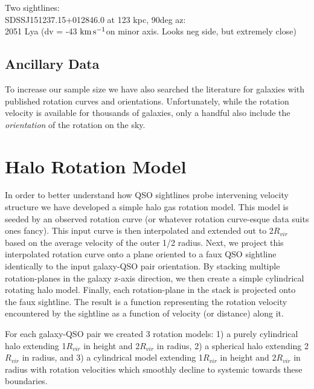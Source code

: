 \documentclass[iop]{emulateapj-rtx4}
\newcommand{\kms}{$\rm km\, s^{-1}$}
\begin{document}
Two sightlines: \\
SDSSJ151237.15+012846.0 at 123 kpc, 90deg az: \\
2051 Lya (dv = -43 \kms on minor axis. Looks neg side, but extremely close)



\subsection{Ancillary Data}
To increase our sample size we have also searched the literature for galaxies with published rotation curves and orientations. Unfortunately, while the rotation velocity is available for thousands of galaxies, only a handful also include the \emph{orientation} of the rotation on the sky. 




\section{Halo Rotation Model}
In order to better understand how QSO sightlines probe intervening velocity structure we have developed a simple halo gas rotation model. This model is seeded by an observed rotation curve (or whatever rotation curve-esque data suits ones fancy). This input curve is then interpolated and extended out to 2$R_{vir}$ based on the average velocity of the outer 1/2 radius. Next, we project this interpolated rotation curve onto a plane oriented to a faux QSO sightline identically to the input galaxy-QSO pair orientation. By stacking multiple rotation-planes in the galaxy z-axis direction, we then create a simple cylindrical rotating halo model. Finally, each rotation-plane in the stack is projected onto the faux sightline. The result is a function representing the rotation velocity encountered by the sightline as a function of velocity (or distance) along it.

For each galaxy-QSO pair we created 3 rotation models: 1) a purely cylindrical halo extending 1$R_{vir}$ in height and 2$R_{vir}$ in radius, 2) a spherical halo extending 2$R_{vir}$ in radius, and 3) a cylindrical model extending 1$R_{vir}$ in height and 2$R_{vir}$ in radius with rotation velocities which smoothly decline to systemic towards these boundaries.



\end{document}
